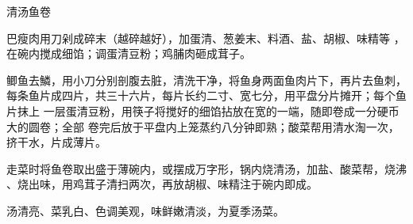 \begin{recipe}{清汤鱼卷}

\ingredients


\preparation

\step 巴瘦肉用刀剁成碎末（越碎越好），加蛋清、葱姜末、料酒、盐、胡椒、味精等
，在碗内搅成细馅；调蛋清豆粉；鸡脯肉砸成茸子。

\step 鲫鱼去鱗，用小刀分别剖腹去脏，清洗干净，将鱼身两面鱼肉片下，再片去鱼刺，
每条鱼片成四片，共三十六片，每片长约二寸、宽七分，用平盘分片摊开；每个鱼片抹上
一层蛋清豆粉，用筷子将搅好的细馅拈放在宽的一端，随即卷成一分硬币大的圆卷；全部
卷完后放于平盘内上笼蒸约八分钟即熟；酸菜帮用清水淘一次，挤干水，片成薄片。

\step 走菜时将鱼卷取出盛于薄碗内，或摆成万字形，锅内烧清汤，加盐、酸菜帮，烧沸
、烧出味，用鸡茸子清扫两次，再放胡椒、味精注于碗内即成。

\features

汤清亮、菜乳白、色调美观，味鲜嫩清淡，为夏季汤菜。

\end{recipe}

